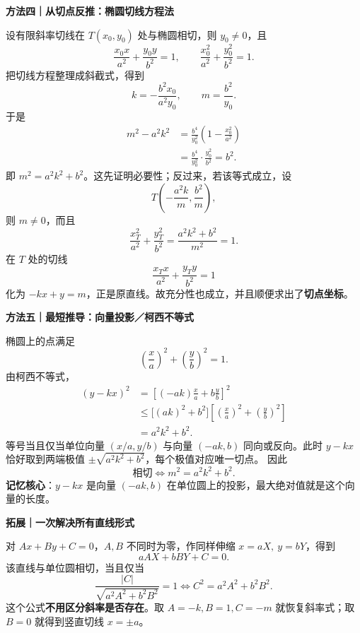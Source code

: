 \begin{proofbox}
\medskip
\textbf{方法四｜从切点反推：椭圆切线方程法}\par
设有限斜率切线在 $T(x_0,y_0)$ 处与椭圆相切，则 $y_0\ne0$，且
\[
\frac{x_0x}{a^2}+\frac{y_0y}{b^2}=1,
\qquad
\frac{x_0^2}{a^2}+\frac{y_0^2}{b^2}=1.
\]
把切线方程整理成斜截式，得到
\[
k=-\frac{b^2x_0}{a^2y_0},\qquad m=\frac{b^2}{y_0}.
\]
于是
\[
\begin{aligned}
m^2-a^2k^2
&=\frac{b^4}{y_0^2}\left(1-\frac{x_0^2}{a^2}\right)\\
&=\frac{b^4}{y_0^2}\cdot\frac{y_0^2}{b^2}
=\boxed{b^2}.
\end{aligned}
\]
即 $m^2=a^2k^2+b^2$。这先证明必要性；反过来，若该等式成立，设
\[
T\left(-\frac{a^2k}{m},\frac{b^2}{m}\right),
\]
则 $m\ne0$，而且
\[
\frac{x_T^2}{a^2}+\frac{y_T^2}{b^2}
=\frac{a^2k^2+b^2}{m^2}=1.
\]
在 $T$ 处的切线
\[
\frac{x_Tx}{a^2}+\frac{y_Ty}{b^2}=1
\]
化为 $-kx+y=m$，正是原直线。故充分性也成立，并且顺便求出了\textbf{切点坐标}。

\medskip
\textbf{方法五｜最短推导：向量投影／柯西不等式}\par
椭圆上的点满足
\[
\left(\frac xa\right)^2+\left(\frac yb\right)^2=1.
\]
由柯西不等式，
\[
\begin{aligned}
(y-kx)^2
&=\left[(-ak)\frac xa+b\frac yb\right]^2\\
&\le\big[(ak)^2+b^2\big]
\left[\left(\frac xa\right)^2+\left(\frac yb\right)^2\right]\\
&=a^2k^2+b^2.
\end{aligned}
\]
等号当且仅当单位向量 $(x/a,y/b)$ 与向量 $(-ak,b)$ 同向或反向。此时 $y-kx$ 恰好取到两端极值 $\pm\sqrt{a^2k^2+b^2}$，每个极值对应唯一切点。
因此
\[
\boxed{\text{相切}\iff m^2=a^2k^2+b^2.}
\]
\textbf{记忆核心}：$y-kx$ 是向量 $(-ak,b)$ 在单位圆上的投影，最大绝对值就是这个向量的长度。

\medskip
\textbf{拓展｜一次解决所有直线形式}\par
对 $Ax+By+C=0$，$A,B$ 不同时为零，作同样伸缩 $x=aX,\ y=bY$，得到
\[
aAX+bBY+C=0.
\]
该直线与单位圆相切，当且仅当
\[
\frac{|C|}{\sqrt{a^2A^2+b^2B^2}}=1
\iff\boxed{C^2=a^2A^2+b^2B^2}.
\]
这个公式\textbf{不用区分斜率是否存在}。取 $A=-k,B=1,C=-m$ 就恢复斜率式；取 $B=0$ 就得到竖直切线 $x=\pm a$。
\end{proofbox}
